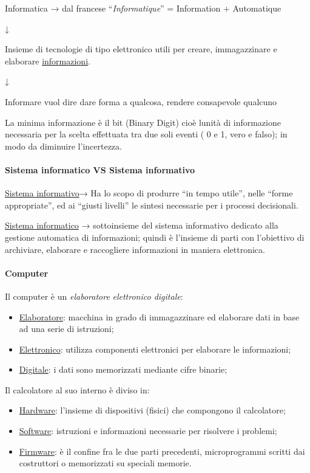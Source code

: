Informatica → dal francese ``\emph{Informatique}'' = Information +
Automatique

↓

Insieme di tecnologie di tipo elettronico utili per creare,
immagazzinare e elaborare \ul{informazioni}.

↓

Informare vuol dire dare forma a qualcosa, rendere consapevole qualcuno

La minima informazione è il bit (Binary Digit) cioè
l\textquotesingle unità di informazione necessaria per la scelta
effettuata tra due soli eventi ( 0 e 1, vero e falso); in modo da
diminuire l'incertezza.

\paragraph{Sistema informatico VS Sistema
informativo}\label{sistema-informatico-vs-sistema-informativo}

\ul{Sistema informativo}→ Ha lo scopo di produrre ``in tempo utile'',
nelle ``forme appropriate'', ed ai ``giusti livelli'' le sintesi
necessarie per i processi decisionali.

\ul{Sistema informatico} → sottoinsieme del sistema informativo dedicato
alla gestione automatica di informazioni; quindi è l'insieme di parti
con l'obiettivo di archiviare, elaborare e raccogliere informazioni in
maniera elettronica.

\paragraph{Computer}\label{computer}

Il computer è un \emph{elaboratore} \emph{elettronico digitale}:

\begin{itemize}
\item
  \ul{Elaboratore}: macchina in grado di immagazzinare ed elaborare dati
  in base ad una serie di istruzioni;
\item
  \ul{Elettronico}: utilizza componenti elettronici per elaborare le
  informazioni;
\item
  \ul{Digitale}: i dati sono memorizzati mediante cifre binarie;
\end{itemize}

Il calcolatore al suo interno è diviso in:

\begin{itemize}
\item
  \ul{Hardware}: l'insieme di dispositivi (fisici) che compongono il
  calcolatore;
\item
  \ul{Software}: istruzioni e informazioni necessarie per risolvere i
  problemi;
\item
  \ul{Firmware}: è il confine fra le due parti precedenti,
  microprogrammi scritti dai costruttori o memorizzati su speciali
  memorie.
\end{itemize}


